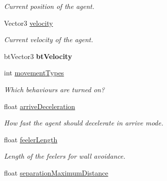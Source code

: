 \begin{DoxyCompactItemize}
\begin{DoxyCompactList}\small\item\em \-Current position of the agent. \end{DoxyCompactList}\item 
\hypertarget{classAIMovementController_af4ae945d0cee92b4208157248174d3f4}{
\-Vector3 \hyperlink{classAIMovementController_af4ae945d0cee92b4208157248174d3f4}{velocity}}
\label{d2/d30/classAIMovementController_af4ae945d0cee92b4208157248174d3f4}

\begin{DoxyCompactList}\small\item\em \-Current velocity of the agent. \end{DoxyCompactList}\item 
\hypertarget{classAIMovementController_a534dbdf5d20d23dac08f002101fdbbc8}{
bt\-Vector3 {\bfseries bt\-Velocity}}
\label{d2/d30/classAIMovementController_a534dbdf5d20d23dac08f002101fdbbc8}

\item 
\hypertarget{classAIMovementController_a8a0752be819f94b838099fabc2f71d75}{
int \hyperlink{classAIMovementController_a8a0752be819f94b838099fabc2f71d75}{movement\-Types}}
\label{d2/d30/classAIMovementController_a8a0752be819f94b838099fabc2f71d75}

\begin{DoxyCompactList}\small\item\em \-Which behaviours are turned on? \end{DoxyCompactList}\item 
\hypertarget{classAIMovementController_a4ab0f981920235787865cef01c6bc186}{
float \hyperlink{classAIMovementController_a4ab0f981920235787865cef01c6bc186}{arrive\-Deceleration}}
\label{d2/d30/classAIMovementController_a4ab0f981920235787865cef01c6bc186}

\begin{DoxyCompactList}\small\item\em \-How fast the agent should decelerate in arrive mode. \end{DoxyCompactList}\item 
\hypertarget{classAIMovementController_a32379d197a5ae30e0072b616114d1b61}{
float \hyperlink{classAIMovementController_a32379d197a5ae30e0072b616114d1b61}{feeler\-Length}}
\label{d2/d30/classAIMovementController_a32379d197a5ae30e0072b616114d1b61}

\begin{DoxyCompactList}\small\item\em \-Length of the feelers for wall avoidance. \end{DoxyCompactList}\item 
\hypertarget{classAIMovementController_a748bd6fd1048626b79646b4d6c0cabbf}{
float \hyperlink{classAIMovementController_a748bd6fd1048626b79646b4d6c0cabbf}{separation\-Maximum\-Distance}}
\label{d2/d30/classAIMovementController_a748bd6fd1048626b79646b4d6c0cabbf}


\end{DoxyCompactItemize}
